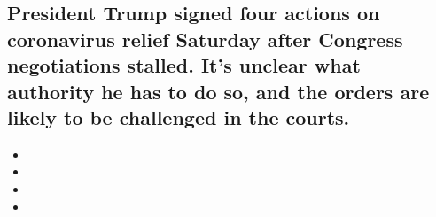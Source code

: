 \hypertarget{president-trump-signed-four-actions-on-coronavirus-relief-saturday-after-congress-negotiations-stalled-its-unclear-what-authority-he-has-to-do-so-and-the-orders-are-likely-to-be-challenged-in-the-courts-1}{%
\subsection{President Trump signed four actions on coronavirus relief
Saturday after Congress negotiations stalled. It's unclear what
authority he has to do so, and the orders are likely to be challenged in
the
courts.}\label{president-trump-signed-four-actions-on-coronavirus-relief-saturday-after-congress-negotiations-stalled-its-unclear-what-authority-he-has-to-do-so-and-the-orders-are-likely-to-be-challenged-in-the-courts-1}}

\begin{itemize}
\item
\item
\item
\item
\end{itemize}

